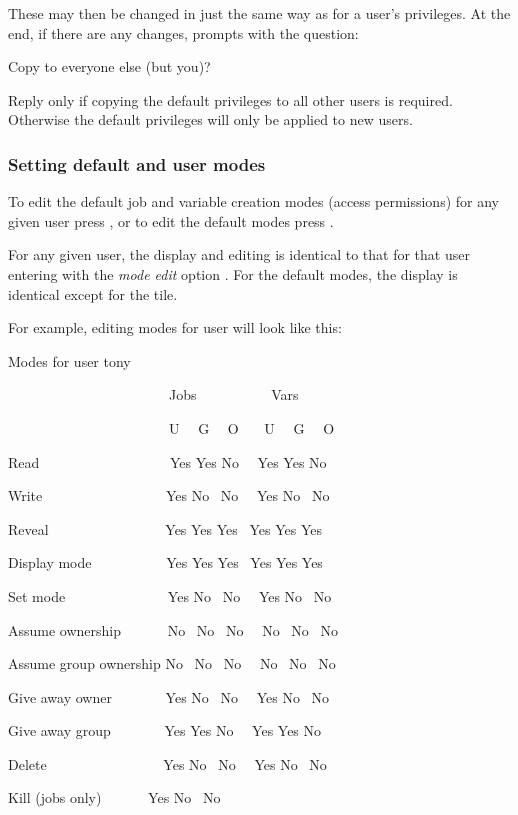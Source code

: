 These may then be changed in just the same way as for a user's privileges. At the end, if there are any
changes, \PrBtuser{} prompts with the question:

\begin{expara}

Copy to everyone else (but you)?

\end{expara}

Reply  only if copying the default privileges to
all other users is required. Otherwise the default privileges will only
be applied to new users.

\subsubsection{Setting default and user modes}
To edit the default job and variable creation modes (access permissions) for any given user press , or to edit the
default modes press .

For any given user, the display and editing is identical to that for that user entering \PrBtuser{} with the \textit{mode edit} option
. For the default modes, the display is identical except for the tile.

For example, editing modes for user  will look like this:

\begin{exparasmall}

Modes for user tony

\bigskip


\ \ \ \ \ \ \ \ \ \ \ \ \ \ \ \ \ \ \ \ \ \ \ Jobs
\ \ \ \ \ \ \ \ \ \ Vars

\ \ \ \ \ \ \ \ \ \ \ \ \ \ \ \ \ \ \ \ \ \ \ U \ \ G \ \ O \ \ \ U
\ \ G \ \ O

Read \ \ \ \ \ \ \ \ \ \ \ \ \ \ \ \ \ \ Yes Yes No \ \ Yes Yes No

Write \ \ \ \ \ \ \ \ \ \ \ \ \ \ \ \ \ Yes No \ No \ \ Yes No \ No

Reveal \ \ \ \ \ \ \ \ \ \ \ \ \ \ \ \ Yes Yes Yes \ Yes Yes Yes

Display mode \ \ \ \ \ \ \ \ \ \ Yes Yes Yes \ Yes Yes Yes

Set mode \ \ \ \ \ \ \ \ \ \ \ \ \ \ Yes No \ No \ \ Yes No \ No

Assume ownership \ \ \ \ \ \ No \ No \ No \ \ No \ No \ No

Assume group ownership No \ No \ No \ \ No \ No \ No

Give away owner \ \ \ \ \ \ \ Yes No \ No \ \ Yes No \ No

Give away group \ \ \ \ \ \ \ Yes Yes No \ \ Yes Yes No

Delete \ \ \ \ \ \ \ \ \ \ \ \ \ \ \ \ Yes No \ No \ \ Yes No \ No

Kill (jobs only) \ \ \ \ \ \ Yes No \ No

\end{exparasmall}

